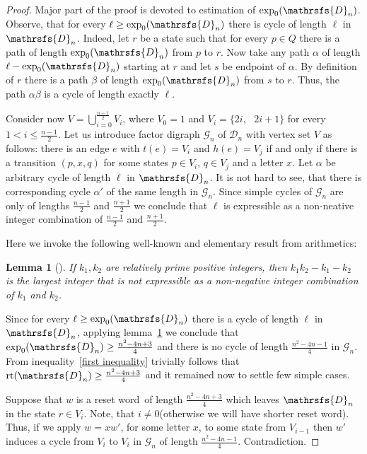 \documentclass[12pt,twoside]{article}
\newcommand{\sw}{reset word}
\newtheorem{lemma}[theorem]{Lemma}
\DeclareMathOperator{\rt}{rt}
\begin{document}
\begin{proof}

Major part of the proof is devoted to estimation of $\exp_0(\mathrsfs{D}_n)$.
Observe, that for every $\ell \geq \exp_0(\mathrsfs{D}_n)$ there
is cycle of length $\ell$ in $\mathrsfs{D}_n$. Indeed, let $r$ be a state such
that for every $p \in Q$ there is a path of length $\exp_0(\mathrsfs{D}_n)$ from
$p$ to $r$. Now take any path $\alpha$ of length $\ell - \exp_0(\mathrsfs{D}_n)$
starting at $r$ and let $s$ be endpoint of $\alpha$. By definition of $r$ there is a path
$\beta$ of length $\exp_0(\mathrsfs{D}_n)$ from $s$ to $r$. Thus, the path $\alpha\beta$
is a cycle of length exactly $\ell$.

Consider now $V =\bigcup\limits_{i = 0}^{\frac{n - 1}{2}} V_i$, where $V_0 = {1}$ and $V_i = \{2i,\text{ } 2i + 1\}$ for
every $1 < i \leq \frac{n - 1}{2}$. Let us introduce factor digraph $\mathcal{G}_n$ of
$\mathcal{D}_n$ with vertex set $V$ as follows: there is an edge $e$ with $t(e) = V_i$
and $h(e) = V_j$ if and only if there is a transition $(p,x,q)$ for some states $p \in V_i$,
$q \in V_j$ and a letter $x$.
Let $\alpha$ be arbitrary cycle of length $\ell$ in $\mathrsfs{D}_n$.
It is not hard to see, that there is corresponding
cycle $\alpha'$ of the same length in $\mathcal{G}_n$. Since simple cycles of $\mathcal{G}_n$
are only of lengths $\frac{n - 1}{2}$ and $\frac{n + 1}{2}$ we conclude that $\ell$ is
expressible as a non-neative integer combination of $\frac{n - 1}{2}$
and $\frac{n + 1}{2}$.

Here we invoke the following well-known and elementary result from arithmetics:
\begin{lemma}[{\mdseries\cite[Theorem 2.1.1]{RaAl05}}]
\label{sylvester} If $k_1,k_2$ are relatively prime positive integers, then
$k_1k_2-k_1-k_2$ is the largest integer that is not expressible as a
non-negative integer combination of $k_1$ and $k_2$.
\end{lemma}
Since for every $\ell \geq \exp_0(\mathrsfs{D}_n)$ there is a cycle of
length $\ell$ in $\mathrsfs{D}_n$, applying lemma~\ref{sylvester} we conclude that
$\exp_0(\mathrsfs{D}_n) \geq \frac{n^2 -4n + 3}{4}$ and there is no cycle of length $\frac{n^2 -4n - 1}{4}$ in $\mathcal{G}_n$.
From inequality~\ref{first inequality} trivially follows that $\rt(\mathrsfs{D}_n) \geq \frac{n^2 -4n + 3}{4}$
and it remained now to settle few simple cases.

Suppose that $w$ is a \sw\ of length $\frac{n^2 -4n + 3}{4}$ which leaves $\mathrsfs{D}_n$
in the state $r \in V_i$. Note, that $i \neq 0$(otherwise we will have shorter \sw). Thus, if we apply
$w = xw'$, for some letter $x$, to some state from $V_{i - 1}$ then $w'$ induces a cycle from $V_i$ to $V_i$
in $\mathcal{G}_n$ of length $\frac{n^2 -4n - 1}{4}$. Contradiction.


\end{proof}
\end{document}
